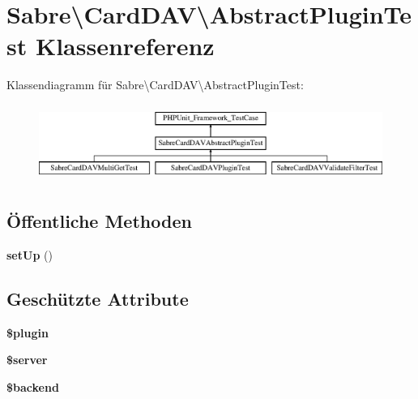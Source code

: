 \hypertarget{class_sabre_1_1_card_d_a_v_1_1_abstract_plugin_test}{}\section{Sabre\textbackslash{}Card\+D\+AV\textbackslash{}Abstract\+Plugin\+Test Klassenreferenz}
\label{class_sabre_1_1_card_d_a_v_1_1_abstract_plugin_test}
Klassendiagramm für Sabre\textbackslash{}Card\+D\+AV\textbackslash{}Abstract\+Plugin\+Test\+:\begin{figure}[H]
\begin{center}
\leavevmode
\includegraphics[height=2.522523cm]{class_sabre_1_1_card_d_a_v_1_1_abstract_plugin_test}
\end{center}
\end{figure}
\subsection*{Öffentliche Methoden}
\begin{DoxyCompactItemize}
\item 
\mbox{\label{class_sabre_1_1_card_d_a_v_1_1_abstract_plugin_test_abccfed0e6f99ef8a8ba3b0c3a10db590}} 
{\bfseries set\+Up} ()
\end{DoxyCompactItemize}
\subsection*{Geschützte Attribute}
\begin{DoxyCompactItemize}
\item 
\mbox{\label{class_sabre_1_1_card_d_a_v_1_1_abstract_plugin_test_ae8879b36746c81120bfecc0fbdff5aeb}} 
{\bfseries \$plugin}
\item 
\mbox{\label{class_sabre_1_1_card_d_a_v_1_1_abstract_plugin_test_aff0bd8ba042e2d419ba9d49c7a628013}} 
{\bfseries \$server}
\item 
\mbox{\label{class_sabre_1_1_card_d_a_v_1_1_abstract_plugin_test_af8d8c8f3bde0866663b04ad5f5f30db7}} 
{\bfseries \$backend}
\end{DoxyCompactItemize}


